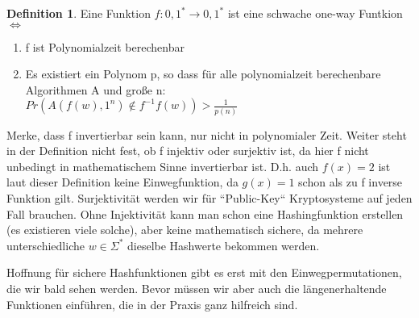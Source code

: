 \documentclass[12pt,a4paper]{article}
\theoremstyle{definition}
\newtheorem{definition}[theorem]{Definition}
\begin{document}

    \begin{definition}
        Eine Funktion $f: {0, 1}^* \longrightarrow {0, 1}^*$ ist eine schwache one-way Funtkion $\Leftrightarrow$
        \begin{enumerate}
            \item f ist Polynomialzeit berechenbar
            \item Es existiert ein Polynom p, so dass für alle polynomialzeit berechenbare Algorithmen A und große n: \\
            $Pr(A(f(w), 1^n) \notin f^{-1}f(w)) > \frac{1}{p(n)}$
        \end{enumerate}

    \end{definition}

    Merke, dass f invertierbar sein kann, nur nicht in polynomialer Zeit. Weiter steht in der Definition nicht fest,
    ob f injektiv oder surjektiv ist, da hier f nicht unbedingt in mathematischem Sinne invertierbar ist. D.h. auch
    $f(x) = 2$ ist laut dieser Definition keine Einwegfunktion, da $g(x) = 1$ schon als zu f inverse Funktion gilt.
    Surjektivität werden wir für ``Public-Key`` Kryptosysteme auf jeden Fall brauchen. Ohne Injektivität kann man schon
    eine Hashingfunktion erstellen (es existieren viele solche), aber keine mathematisch sichere, da mehrere
    unterschiedliche $w \in \Sigma^*$ dieselbe Hashwerte bekommen werden.

    Hoffnung für sichere Hashfunktionen gibt es erst mit den Einwegpermutationen, die wir bald sehen werden. Bevor
    müssen wir aber auch die längenerhaltende Funktionen einführen, die in der Praxis ganz hilfreich sind.

\end{document}
